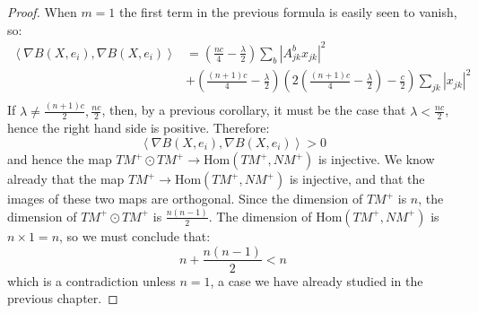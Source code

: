 \documentclass[11pt]{amsart}
\theoremstyle{definition}
\def \la { \left\langle }
\def \ra { \right\rangle }
\def \Hom{ \text{Hom} }
\def \TMp{ TM^{+} }
\def \NMp{ NM^+ }
\begin{document}
\begin{proof} When $m=1$ the first term in the previous formula is easily seen to vanish, so:
%
\begin{align*}
\la \nabla B (X, e_i), \nabla B(X, e_i) \ra &= \left( \frac{nc}{4} - \frac{\lambda}{2} \right) \sum_{b} \left| A^b_{jk} x_{jk} \right|^2 \\
&+ \left( \frac{(n+1)c}{4} - \frac{\lambda}{2} \right) \left( 2 \left( \frac{(n+1)c}{4} - \frac{\lambda}{2} \right) - \frac{c}{2} \right) \sum_{jk} \left| x_{jk} \right|^2 \\
\end{align*}
If $\lambda \neq \frac{(n+1)c}{2}, \frac{nc}{2}$, then, by a previous corollary, it must be the case that $\lambda < \frac{nc}{2}$, hence the right hand side is positive.  Therefore:
%
$$ \la \nabla B (X, e_i), \nabla B(X, e_i) \ra > 0 $$
%
and hence the map $\TMp \odot \TMp \rightarrow \Hom( \TMp, \NMp )$ is injective.  We know already that the map $TM^{+} \rightarrow \Hom( TM^{+}, NM^{+} )$ is injective, and that the images of these two maps are orthogonal.  Since the dimension of $TM^{+}$ is $n$, the dimension of $\TMp \odot \TMp$ is $\frac{n(n-1)}{2}$.  The dimension of $ \Hom ( \TMp, \NMp ) $ is $ n \times 1 = n$, so we must conclude that:
%
$$ n + \frac{n(n-1)}{2} < n $$
%
which is a contradiction unless $n=1$, a case we have already studied in the previous chapter.
\end{proof}

\vfill
\end{document}
